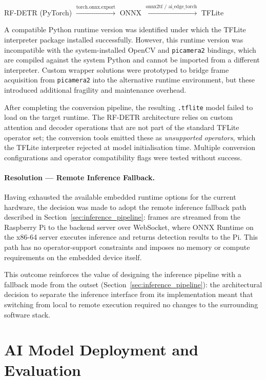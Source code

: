 \begin{center}
RF-DETR (PyTorch) $\xrightarrow{\text{torch.onnx.export}}$
ONNX $\xrightarrow{\text{onnx2tf / ai\_edge\_torch}}$ TFLite
\end{center}
 
A compatible Python runtime version was identified under which the
TFLite interpreter package installed successfully. However, this
runtime version was incompatible with the system-installed OpenCV
and \texttt{picamera2} bindings, which are compiled against the
system Python and cannot be imported from a different interpreter.
Custom wrapper solutions were prototyped to bridge frame acquisition
from \texttt{picamera2} into the alternative runtime environment,
but these introduced additional fragility and maintenance overhead.
 
After completing the conversion pipeline, the resulting
\texttt{.tflite} model failed to load on the target runtime. The
RF-DETR architecture relies on custom attention and decoder operations
that are not part of the standard TFLite operator set; the conversion
tools emitted these as \emph{unsupported operators}, which the TFLite
interpreter rejected at model initialisation time. Multiple conversion
configurations and operator compatibility flags were tested without
success.
 
\paragraph{Resolution — Remote Inference Fallback.}
Having exhausted the available embedded runtime options for the current
hardware, the decision was made to adopt the remote inference fallback
path described in Section~\ref{sec:inference_pipeline}: frames are
streamed from the Raspberry Pi to the backend server over WebSocket,
where ONNX Runtime on the x86-64 server executes inference and returns
detection results to the Pi. This path has no operator-support
constraints and imposes no memory or compute requirements on the
embedded device itself.
 
This outcome reinforces the value of designing the inference pipeline
with a fallback mode from the outset (Section~\ref{sec:inference_pipeline}):
the architectural decision to separate the inference interface from its
implementation meant that switching from local to remote execution
required no changes to the surrounding software stack.
 

\section{AI Model Deployment and Evaluation}
\label{sec:model_deployment}

